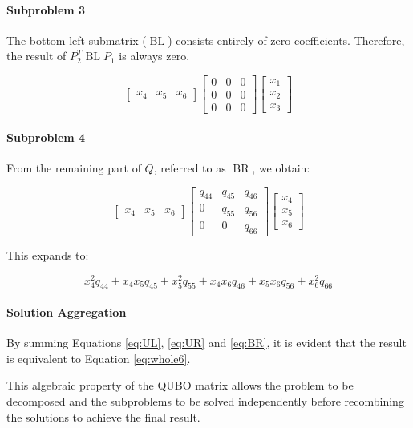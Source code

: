 \paragraph{Subproblem 3} The bottom-left submatrix ($\operatorname{BL}$) consists entirely of zero coefficients. 
Therefore, the result of $P_2^T\operatorname{BL}P_1$ is always zero.

\begin{equation*}
    \begin{bmatrix}
        x_4 & x_5 & x_6
    \end{bmatrix}
    \begin{bmatrix}
        0 & 0 & 0 \\
        0 & 0 & 0 \\
        0 & 0 & 0
    \end{bmatrix}
    \begin{bmatrix}
        x_1 \\
        x_2 \\
        x_3
    \end{bmatrix}
\end{equation*}

\paragraph{Subproblem 4} From the remaining part of $Q$, referred to as $\operatorname{BR}$, we obtain:

\begin{equation*}
    \begin{bmatrix}
        x_4 & x_5 & x_6
    \end{bmatrix}
    \begin{bmatrix}
        q_{44} & q_{45} & q_{46} \\
        0 & q_{55} & q_{56} \\
        0 & 0 & q_{66}
    \end{bmatrix}
    \begin{bmatrix}
        x_4 \\
        x_5 \\
        x_6
    \end{bmatrix}
\end{equation*}

This expands to:

\begin{equation}
 x_4^2q_{44} + x_4x_5q_{45} + x_5^2q_{55} + x_4x_6q_{46} + x_5x_6q_{56} + x_6^2q_{66}
    \label{eq:BR}
\end{equation}

\paragraph{Solution Aggregation} By summing Equations \ref{eq:UL}, \ref{eq:UR} and \ref{eq:BR}, it is evident that the result is equivalent to Equation \ref{eq:whole6}.

This algebraic property of the QUBO matrix allows the problem to be decomposed and the subproblems to be solved independently before recombining the solutions to achieve the final result.